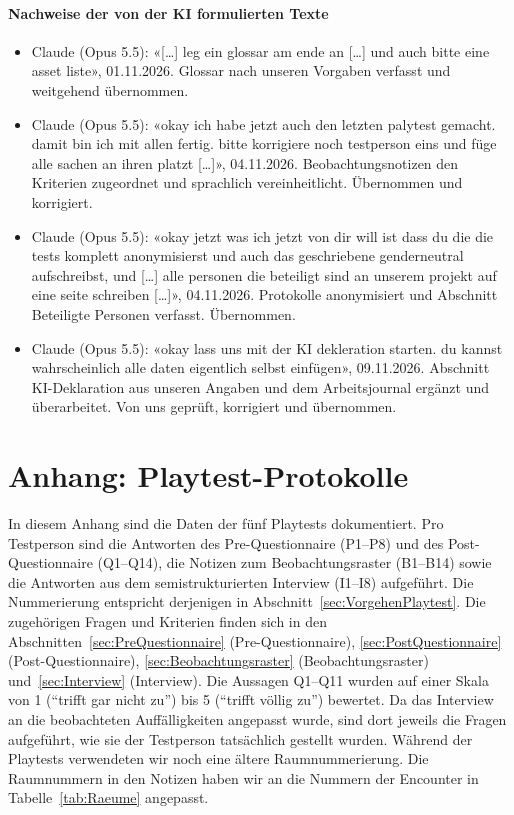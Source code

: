 \documentclass[../Main.tex]{subfiles}
\begin{document}
\paragraph{Nachweise der von der KI formulierten Texte}
\begin{itemize}[leftmargin=1.5cm, itemsep=0.4em]
    \item Claude (Opus 5.5): «[\ldots] leg ein glossar am ende an [\ldots] und auch bitte eine asset liste», 01.11.2026. Glossar nach unseren Vorgaben verfasst und weitgehend übernommen.
    \item Claude (Opus 5.5): «okay ich habe jetzt auch den letzten palytest gemacht. damit bin ich mit allen fertig. bitte korrigiere noch testperson eins und füge alle sachen an ihren platzt [\ldots]», 04.11.2026. Beobachtungsnotizen den Kriterien zugeordnet und sprachlich vereinheitlicht. Übernommen und korrigiert.
    \item Claude (Opus 5.5): «okay jetzt was ich jetzt von dir will ist dass du die die tests komplett anonymisierst und auch das geschriebene genderneutral aufschreibst, und [\ldots] alle personen die beteiligt sind an unserem projekt auf eine seite schreiben [\ldots]», 04.11.2026. Protokolle anonymisiert und Abschnitt Beteiligte Personen verfasst. Übernommen.
    \item Claude (Opus 5.5): «okay lass uns mit der KI dekleration starten. du kannst wahrscheinlich alle daten eigentlich selbst einfügen», 09.11.2026. Abschnitt KI-Deklaration aus unseren Angaben und dem Arbeitsjournal ergänzt und überarbeitet. Von uns geprüft, korrigiert und übernommen.
\end{itemize}

\newpage
{}
\section{Anhang: Playtest-Protokolle} \label{sec:PlaytestProtokolle}

In diesem Anhang sind die Daten der fünf Playtests dokumentiert. Pro Testperson sind die Antworten des Pre-Questionnaire (P1--P8) und des Post-Questionnaire (Q1--Q14), die Notizen zum Beobachtungsraster (B1--B14) sowie die Antworten aus dem semistrukturierten Interview (I1--I8) aufgeführt. Die Nummerierung entspricht derjenigen in Abschnitt~\ref{sec:VorgehenPlaytest}. Die zugehörigen Fragen und Kriterien finden sich in den Abschnitten~\ref{sec:PreQuestionnaire} (Pre-Questionnaire), \ref{sec:PostQuestionnaire} (Post-Questionnaire), \ref{sec:Beobachtungsraster} (Beobachtungsraster) und~\ref{sec:Interview} (Interview). Die Aussagen Q1--Q11 wurden auf einer Skala von 1 (\enquote{trifft gar nicht zu}) bis 5 (\enquote{trifft völlig zu}) bewertet. Da das Interview an die beobachteten Auffälligkeiten angepasst wurde, sind dort jeweils die Fragen aufgeführt, wie sie der Testperson tatsächlich gestellt wurden. Während der Playtests verwendeten wir noch eine ältere Raumnummerierung. Die Raumnummern in den Notizen haben wir an die Nummern der Encounter in Tabelle~\ref{tab:Raeume} angepasst.
\end{document}
